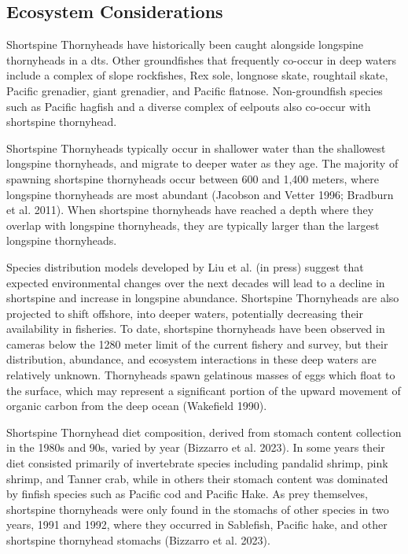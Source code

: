 \documentclass[11pt,
  english,
  letterpaper,
]{article}
\begin{document}
\hypertarget{ecosystem-considerations-1}{%
\subsection{Ecosystem Considerations}\label{ecosystem-considerations-1}}

Shortspine Thornyheads have historically been caught alongside longspine thornyheads in a \gls{dts}. Other groundfishes that frequently co-occur in deep waters include a complex of slope rockfishes, Rex sole, longnose skate, roughtail skate, Pacific grenadier, giant grenadier, and Pacific flatnose. Non-groundfish species such as Pacific hagfish and a diverse complex of eelpouts also co-occur with shortspine thornyhead.

Shortspine Thornyheads typically occur in shallower water than the shallowest longspine thornyheads, and migrate to deeper water as they age. The majority of spawning shortspine thornyheads occur between 600 and 1,400 meters, where longspine thornyheads are most abundant (Jacobson and Vetter 1996; Bradburn et al. 2011). When shortspine thornyheads have reached a depth where they overlap with longspine thornyheads, they are typically larger than the largest longspine thornyheads.

Species distribution models developed by Liu et al. (in press) suggest that expected environmental changes over the next decades will lead to a decline in shortspine and increase in longspine abundance. Shortspine Thornyheads are also projected to shift offshore, into deeper waters, potentially decreasing their availability in fisheries. To date, shortspine thornyheads have been observed in cameras below the 1280 meter limit of the current fishery and survey, but their distribution, abundance, and ecosystem interactions in these deep waters are relatively unknown. Thornyheads spawn gelatinous masses of eggs which float to the surface, which may represent a significant portion of the upward movement of organic carbon from the deep ocean (Wakefield 1990).

Shortspine Thornyhead diet composition, derived from stomach content collection in the 1980s and 90s, varied by year (Bizzarro et al. 2023). In some years their diet consisted primarily of invertebrate species including pandalid shrimp, pink shrimp, and Tanner crab, while in others their stomach content was dominated by finfish species such as Pacific cod and Pacific Hake. As prey themselves, shortspine thornyheads were only found in the stomachs of other species in two years, 1991 and 1992, where they occurred in Sablefish, Pacific hake, and other shortspine thornyhead stomachs (Bizzarro et al. 2023).
\end{document}
